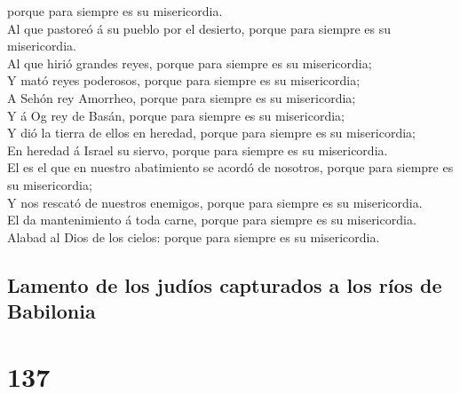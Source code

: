 porque para siempre es su misericordia.\\
 Al que pastoreó á su pueblo por el desierto, porque para
siempre es su misericordia.\\
 Al que hirió grandes reyes, porque para siempre es su
misericordia;\\
 Y mató reyes poderosos, porque para siempre es su
misericordia;\\
 A Sehón rey Amorrheo, porque para siempre es su
misericordia;\\
 Y á Og rey de Basán, porque para siempre es su
misericordia;\\
 Y dió la tierra de ellos en heredad, porque para siempre
es su misericordia;\\
 En heredad á Israel su siervo, porque para siempre es su
misericordia.\\
 El es el que en nuestro abatimiento se acordó de nosotros,
porque para siempre es su misericordia;\\
 Y nos rescató de nuestros enemigos, porque para siempre es
su misericordia.\\
 El da mantenimiento á toda carne, porque para siempre es
su misericordia.\\
 Alabad al Dios de los cielos: porque para siempre es su
misericordia.

\hypertarget{lamento-de-los-juduxedos-capturados-a-los-ruxedos-de-babilonia}{%
\subsection{Lamento de los judíos capturados a los ríos de
Babilonia}\label{lamento-de-los-juduxedos-capturados-a-los-ruxedos-de-babilonia}}

\hypertarget{section-136}{%
\section{137}\label{section-136}}


